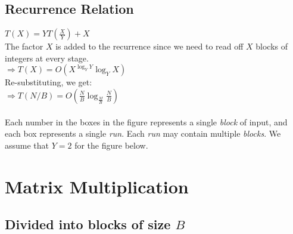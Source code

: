 \documentclass{article}
\begin{document}
\subsection{Recurrence Relation}

$T(X) = YT(\frac{X}{Y}) + X$\\
The factor $X$ is added to the recurrence since we need to read off
$X$ blocks of integers at every stage.\\
$\Rightarrow T(X) = O(X^{\log_Y{Y}}\log_Y{X})$\\
Re-substituting, we get:\\
$\Rightarrow T(N/B) = O(\frac{N}{B}\log_{\frac{M}{B}}{\frac{N}{B}})$\\
\\
Each number in the boxes in the figure represents a single
\textit{block} of input, and each box represents a single
\textit{run}. Each \textit{run} may contain multiple
\textit{blocks}. We assume that $Y = 2$ for the figure below.

\begin{center}
\end{center}


\clearpage


\section{Matrix Multiplication}

\subsection{Divided into blocks of size $B$}
\end{document}
